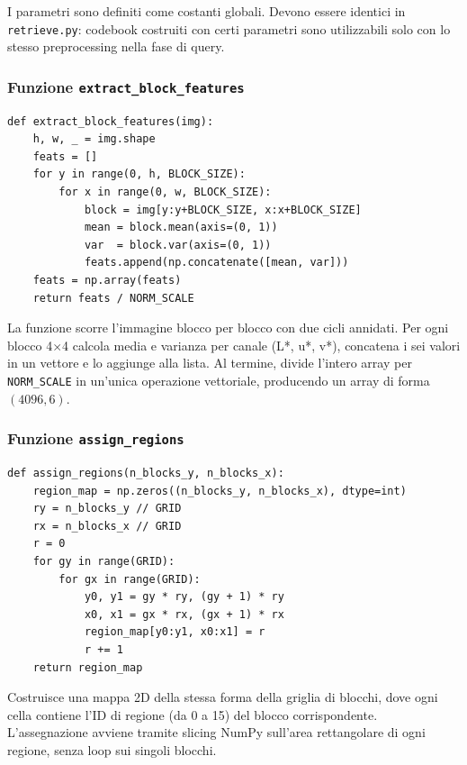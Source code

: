 \documentclass[12pt, a4paper]{article}
\begin{document}
I parametri sono definiti come costanti globali. Devono essere identici in
\texttt{retrieve.py}: codebook costruiti con certi parametri sono utilizzabili solo con
lo stesso preprocessing nella fase di query.

\subsubsection{Funzione \texttt{extract\_block\_features}}

\begin{lstlisting}[caption={Funzione \texttt{extract\_block\_features}}]
def extract_block_features(img):
    h, w, _ = img.shape
    feats = []
    for y in range(0, h, BLOCK_SIZE):
        for x in range(0, w, BLOCK_SIZE):
            block = img[y:y+BLOCK_SIZE, x:x+BLOCK_SIZE]
            mean = block.mean(axis=(0, 1))
            var  = block.var(axis=(0, 1))
            feats.append(np.concatenate([mean, var]))
    feats = np.array(feats)
    return feats / NORM_SCALE
\end{lstlisting}

La funzione scorre l'immagine blocco per blocco con due cicli annidati. Per ogni blocco
4$\times$4 calcola media e varianza per canale (L*, u*, v*), concatena i sei valori in un
vettore e lo aggiunge alla lista. Al termine, divide l'intero array per \texttt{NORM\_SCALE}
in un'unica operazione vettoriale, producendo un array di forma $(4096, 6)$.

\subsubsection{Funzione \texttt{assign\_regions}}

\begin{lstlisting}[caption={Funzione \texttt{assign\_regions}}]
def assign_regions(n_blocks_y, n_blocks_x):
    region_map = np.zeros((n_blocks_y, n_blocks_x), dtype=int)
    ry = n_blocks_y // GRID
    rx = n_blocks_x // GRID
    r = 0
    for gy in range(GRID):
        for gx in range(GRID):
            y0, y1 = gy * ry, (gy + 1) * ry
            x0, x1 = gx * rx, (gx + 1) * rx
            region_map[y0:y1, x0:x1] = r
            r += 1
    return region_map
\end{lstlisting}

Costruisce una mappa 2D della stessa forma della griglia di blocchi, dove ogni cella contiene
l'ID di regione (da 0 a 15) del blocco corrispondente. L'assegnazione avviene tramite slicing
NumPy sull'area rettangolare di ogni regione, senza loop sui singoli blocchi.
\end{document}
